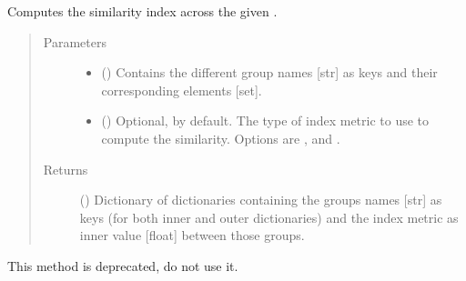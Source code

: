 \documentclass[letterpaper,10pt,english]{sphinxmanual}
\begin{document}
\begin{fulllineitems}

\begin{fulllineitems}
\label{\detokenize{main:pypath.main.PyPath.similarity_groups}}
Computes the similarity index across the given .
\begin{quote}\begin{description}
\item[{Parameters}] \leavevmode\begin{itemize}
\item {} 
 () \textendash{} Contains the different group names {[}str{]} as keys and their
corresponding elements {[}set{]}.

\item {} 
 () \textendash{} Optional,  by default. The type of index metric
to use to compute the similarity. Options are ,
 and .

\end{itemize}

\item[{Returns}] \leavevmode
() \textendash{} Dictionary of dictionaries containing the groups
names {[}str{]} as keys (for both inner and outer dictionaries)
and the index metric as inner value {[}float{]} between those
groups.

\end{description}\end{quote}

\end{fulllineitems}


\begin{fulllineitems}
\label{\detokenize{main:pypath.main.PyPath.small_plot}}
This method is deprecated, do not use it.

\end{fulllineitems}


\end{fulllineitems}
\end{document}
